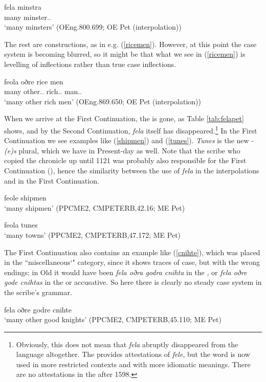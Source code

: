 \documentclass[output=paper,colorlinks,citecolor=brown]{langscibook}
\begin{document}
\ea\label{minstra}
\gll fela minstra\\
many minster.\GEN.\PL{}\\
\glt ‘many minsters’ (OEng.800.699; OE Pet (interpolation))
\z

The rest are  constructions, as in e.g. (\ref{ricemen}). However, at this point the case system is becoming blurred, so it might be that what we see in (\ref{ricemen}) is levelling of inflections rather than true case inflections.

\ea\label{ricemen}
\gll feola oðre rice men\\
many other.\NOM.\PL{} rich.\NOM.\PL{} man.\NOM.\PL{}\\
\glt ‘many other rich men’ (OEng.869.650; OE Pet (interpolation))
\z

When we arrive at the First Continuation, the  is gone, as Table \ref{tab:felapet} shows, and by the Second Continuation, \textit{fela} itself has disappeared.\footnote{Obviously, this does not mean that \textit{fela} abruptly disappeared from the language altogether. The \citet{MED} provides attestations of \textit{fele}, but the word is now used in more restricted contexts and with more idiomatic meanings. There are no attestations in the \citet{OED} after 1598.} In the First Continuation we see examples like (\ref{shipmen}) and (\ref{tunes}). \textit{Tunes} is the new -\textit{(e)s} plural, which we have in Present-day  as well. Note that the scribe who copied the chronicle up until 1121 was probably also responsible for the First Continuation (\cite[6--7]{BergsSkaffari07}), hence the similarity between the use of \textit{fela} in the interpolations and in the First Continuation.

\ea\label{shipmen}
feole shipmen\\
‘many shipmen’ (PPCME2, CMPETERB,42.16; ME Pet)
\z

\ea\label{tunes}
feola tunes\\
‘many towns’ (PPCME2, CMPETERB,47.172; ME Pet)
\z

The First Continuation also contains an example like (\ref{cnihte}), which was placed in the ``miscellaneous`" category, since it shows traces of  case, but with the wrong endings; in Old  it would have been \textit{fela oðra godra cnihta} in the , or \textit{fela oðre gode cnihtas} in the  or accusative. So here there is clearly no steady case system in the scribe’s grammar. 

\ea\label{cnihte}
fela oðre godre cnihte\\
‘many other good knights’ (PPCME2, CMPETERB,45.110; ME Pet)
\z
\end{document}
